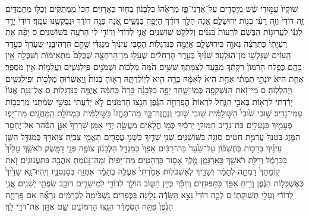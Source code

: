 \documentclass[11pt,twoside]{article}
\begin{document}
{שׁוֹקָיו֙ עַמּ֣וּדֵי שֵׁ֔שׁ מְיֻסָּדִ֖ים עַל־אַדְנֵי־פָ֑ז מַרְאֵ֙הוּ֙ כַּלְּבָנ֔וֹן בָּח֖וּר כָּאֲרָזִֽים׃
חִכּוֹ֙ מַֽמְתַקִּ֔ים וְכֻלּ֖וֹ מַחֲמַדִּ֑ים זֶ֤ה דוֹדִי֙ וְזֶ֣ה רֵעִ֔י בְּנ֖וֹת יְרוּשָׁלָֽ͏ִם׃
אָ֚נָה הָלַ֣ךְ דּוֹדֵ֔ךְ הַיָּפָ֖ה בַּנָּשִׁ֑ים אָ֚נָה פָּנָ֣ה דוֹדֵ֔ךְ וּנְבַקְשֶׁ֖נּוּ עִמָּֽךְ׃
דּוֹדִי֙ יָרַ֣ד לְגַנּ֔וֹ לַעֲרוּג֖וֹת הַבֹּ֑שֶׂם לִרְעוֹת֙ בַּגַּנִּ֔ים וְלִלְקֹ֖ט שֽׁוֹשַׁנִּֽים׃
אֲנִ֤י לְדוֹדִי֙ וְדוֹדִ֣י לִ֔י הָרֹעֶ֖ה בַּשׁוֹשַׁנִּֽים׃ ס
יָפָ֨ה אַ֤תְּ רַעְיָתִי֙ כְּתִרְצָ֔ה נָאוָ֖ה כִּירוּשָׁלָ֑͏ִם אֲיֻמָּ֖ה כַּנִּדְגָּלֽוֹת׃
הָסֵ֤בִּי עֵינַ֙יִךְ֙ מִנֶּגְדִּ֔י שֶׁ֥הֵ֖ם הִרְהִיבֻ֑נִי שַׂעְרֵךְ֙ כְּעֵ֣דֶר הָֽעִזִּ֔ים שֶׁגָּלְשׁ֖וּ מִן־הַגִּלְעָֽד׃
שִׁנַּ֙יִךְ֙ כְּעֵ֣דֶר הֽ͏ָרְחֵלִ֔ים שֶׁעָל֖וּ מִן־הָרַחְצָ֑ה שֶׁכֻּלָּם֙ מַתְאִימ֔וֹת וְשַׁכֻּלָ֖ה אֵ֥ין בָּהֶֽם׃
כְּפֶ֤לַח הָרִמּוֹן֙ רַקָּתֵ֔ךְ מִבַּ֖עַד לְצַמָּתֵֽךְ׃
שִׁשִּׁ֥ים הֵ֙מָּה֙ מְּלָכ֔וֹת וּשְׁמֹנִ֖ים פִּֽילַגְשִׁ֑ים וַעֲלָמ֖וֹת אֵ֥ין מִסְפָּֽר׃
אַחַ֥ת הִיא֙ יוֹנָתִ֣י תַמָּתִ֔י אַחַ֥ת הִיא֙ לְאִמָּ֔הּ בָּרָ֥ה הִ֖יא לְיֽוֹלַדְתָּ֑הּ רָא֤וּהָ בָנוֹת֙ וַֽיְאַשְּׁר֔וּהָ מְלָכ֥וֹת וּפִֽילַגְשִׁ֖ים וַֽיְהַלְלֽוּהָ׃ ס
מִי־זֹ֥את הַנִּשְׁקָפָ֖ה כְּמוֹ־שָׁ֑חַר יָפָ֣ה כַלְּבָנָ֗ה בָּרָה֙ כַּֽחַמָּ֔ה אֲיֻמָּ֖ה כַּנִּדְגָּלֽוֹת׃ ס
אֶל־גִּנַּ֤ת אֱגוֹז֙ יָרַ֔דְתִּי לִרְא֖וֹת בְּאִבֵּ֣י הַנָּ֑חַל לִרְאוֹת֙ הֲפָֽרְחָ֣ה הַגֶּ֔פֶן הֵנֵ֖צוּ הָרִמֹּנִֽים׃
לֹ֣א יָדַ֔עְתִּי נַפְשִׁ֣י שָׂמַ֔תְנִי מַרְכְּב֖וֹת עַמִּי־נָדִֽיב׃
שׁ֤וּבִי שׁ֙וּבִי֙ הַשּׁ֣וּלַמִּ֔ית שׁ֥וּבִי שׁ֖וּבִי וְנֶחֱזֶה־בָּ֑ךְ מַֽה־תֶּחֱזוּ֙ בַּשּׁ֣וּלַמִּ֔ית כִּמְחֹלַ֖ת הַֽמַּחֲנָֽיִם׃
מַה־יָּפ֧וּ פְעָמַ֛יִךְ בַּנְּעָלִ֖ים בַּת־נָדִ֑יב חַמּוּקֵ֣י יְרֵכַ֔יִךְ כְּמ֣וֹ חֲלָאִ֔ים מַעֲשֵׂ֖ה יְדֵ֥י אָמָּֽן׃
שָׁרְרֵךְ֙ אַגַּ֣ן הַסַּ֔הַר אַל־יֶחְסַ֖ר הַמָּ֑זֶג בִּטְנֵךְ֙ עֲרֵמַ֣ת חִטִּ֔ים סוּגָ֖ה בַּשּׁוֹשַׁנִּֽים׃
שְׁנֵ֥י שָׁדַ֛יִךְ כִּשְׁנֵ֥י עֳפָרִ֖ים תָּאֳמֵ֥י צְבִיָּֽה׃
צַוָּארֵ֖ךְ כְּמִגְדַּ֣ל הַשֵּׁ֑ן עֵינַ֜יִךְ בְּרֵכ֣וֹת בְּחֶשְׁבּ֗וֹן עַל־שַׁ֙עַר֙ בַּת־רַבִּ֔ים אַפֵּךְ֙ כְּמִגְדַּ֣ל הַלְּבָנ֔וֹן צוֹפֶ֖ה פְּנֵ֥י דַמָּֽשֶׂק׃
רֹאשֵׁ֤ךְ עָלַ֙יִךְ֙ כַּכַּרְמֶ֔ל וְדַלַּ֥ת רֹאשֵׁ֖ךְ כָּאַרְגָּמָ֑ן מֶ֖לֶךְ אָס֥וּר בָּרְהָטִֽים׃
מַה־יָּפִית֙ וּמַה־נָּעַ֔מְתְּ אַהֲבָ֖ה בַּתַּֽעֲנוּגִֽים׃
זֹ֤את קֽוֹמָתֵךְ֙ דָּֽמְתָ֣ה לְתָמָ֔ר וְשָׁדַ֖יִךְ לְאַשְׁכֹּלֽוֹת׃
אָמַ֙רְתִּי֙ אֶעֱלֶ֣ה בְתָמָ֔ר אֹֽחֲזָ֖ה בְּסַנְסִנָּ֑יו וְיִֽהְיוּ־נָ֤א שָׁדַ֙יִךְ֙ כְּאֶשְׁכְּל֣וֹת הַגֶּ֔פֶן וְרֵ֥יחַ אַפֵּ֖ךְ כַּתַּפּוּחִֽים׃
וְחִכֵּ֕ךְ כְּיֵ֥ין הַטּ֛וֹב הוֹלֵ֥ךְ לְדוֹדִ֖י לְמֵישָׁרִ֑ים דּוֹבֵ֖ב שִׂפְתֵ֥י יְשֵׁנִֽים׃
אֲנִ֣י לְדוֹדִ֔י וְעָלַ֖י תְּשׁוּקָתֽוֹ׃ ס
לְכָ֤ה דוֹדִי֙ נֵצֵ֣א הַשָּׂדֶ֔ה נָלִ֖ינָה בַּכְּפָרִֽים׃
נַשְׁכִּ֙ימָה֙ לַכְּרָמִ֔ים נִרְאֶ֞ה אִם פָּֽרְחָ֤ה הַגֶּ֙פֶן֙ פִּתַּ֣ח הַסְּמָדַ֔ר הֵנֵ֖צוּ הָרִמּוֹנִ֑ים שָׁ֛ם אֶתֵּ֥ן אֶת־דֹּדַ֖י לָֽךְ׃
}
\end{document}
